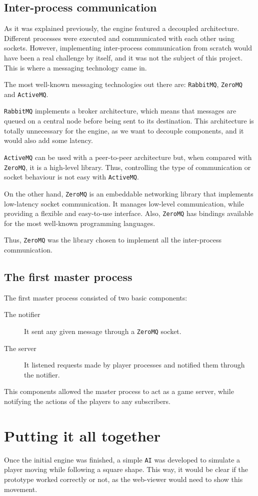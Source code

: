 \documentclass[a4paper,11pt,titlepage,abstract,numbers=noenddot,automark,mnsy,intlimits,rgb,dvipsnames]{report}
\begin{document}
\subsection{Inter-process communication}
As it was explained previously, the engine featured a decoupled architecture. Different processes were
executed and communicated with each other using sockets. However, implementing inter-process communication from
scratch would have been a real challenge by itself, and it was not the subject of this project. This is where a
messaging technology came in.

The most well-known messaging technologies out there are: \texttt{RabbitMQ}, \texttt{ZeroMQ} and \texttt{ActiveMQ}.

\texttt{RabbitMQ} implements
a broker architecture, which means that messages are queued on a central node before being sent to its destination.
This architecture is totally unnecessary for the engine, as we want to decouple components, and it would also add
some latency.

\texttt{ActiveMQ} can be used with a peer-to-peer architecture but, when compared with \texttt{ZeroMQ}, it is a
high-level library. Thus, controlling the type of communication or socket behaviour is not easy with \texttt{ActiveMQ}.

On the other hand, \texttt{ZeroMQ} \cite{zeromq} is an embeddable networking library that implements
low-latency socket communication. It manages low-level communication, while providing a flexible and easy-to-use interface.
Also, \texttt{ZeroMQ} has bindings available for the most well-known programming languages.

Thus, \texttt{ZeroMQ} was the library chosen to implement all the inter-process communication.
\subsection{The first master process}
The first master process consisted of two basic components:
\begin{description}
\item[The notifier]
It sent any given message through a \texttt{ZeroMQ} socket.
\item[The server]
It listened requests made by player processes and notified them through the notifier.
\end{description}
This components allowed the master process to act as a game server, while notifying the actions of the players to any
subscribers.
\section{Putting it all together}
Once the initial engine was finished, a simple \texttt{AI} was developed to simulate a player moving
while following a square shape. This way, it would be clear if the prototype worked correctly or not, as the web-viewer would need
to show this movement.
\end{document}
